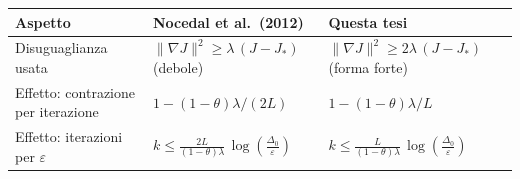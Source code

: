 \documentclass[11pt,a4paper]{article}
\begin{document}
\vspace{1.0em}

\renewcommand{\arraystretch}{1.5}
\scriptsize
\begin{tabular}{@{}p{}p{}p{}@{}}
\toprule
\textbf{Aspetto} & \textbf{Nocedal et al.\ (2012)} & \textbf{Questa tesi} \\
\midrule
Disuguaglianza usata
  & $\|\nabla J\|^2 \ge \lambda\,(J-J_*)$ \newline (debole)
  & $\|\nabla J\|^2 \ge 2\lambda\,(J-J_*)$ \newline (forma forte) \\
Effetto: contrazione per iterazione
  & $1-(1-\theta)\lambda/(2L)$
  & $1-(1-\theta)\lambda/L$ \\
Effetto: iterazioni per $\varepsilon$
  & $k\le\frac{2L}{(1-\theta)\lambda}\,\log\!\left(\frac{\Delta_0}{\varepsilon}\right)$
  & $k\le\frac{L}{(1-\theta)\lambda}\,\log\!\left(\frac{\Delta_0}{\varepsilon}\right)$ \\
\bottomrule
\end{tabular}

\vspace{0.7em}
\end{document}
